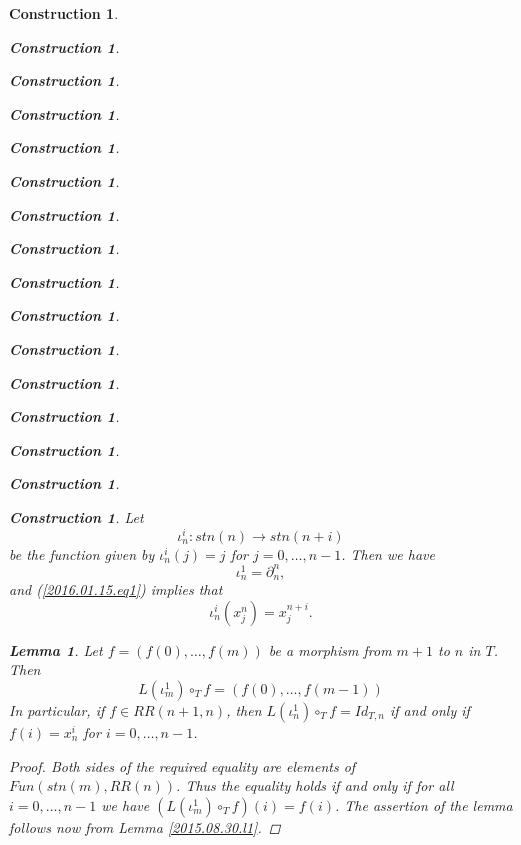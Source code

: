 \documentclass[onecolumn,12pt]{amsart}
\newtheorem{lemma}[proposition]{Lemma}
\numberwithin{proposition}{subsection}
\newtheorem{construction}[proposition]{Construction}
\newcommand{\sr}{\rightarrow}
\newcommand{\hc}{\circ_{T}}
\begin{document}
\begin{construction}
\begin{construction}
\begin{construction}
\begin{construction}
\begin{construction}
\begin{construction}
\begin{construction}
\begin{construction}
\begin{construction}
\begin{construction}
\begin{construction}
\begin{construction}
\begin{construction}
\begin{construction}
\begin{construction}
\begin{construction}
Let 
%
$${\iota}_n^{i}:stn(n)\sr stn(n+i)$$
%
be the function given by ${\iota}_n^i(j)=j$ for $j=0,\dots,n-1$. Then we have
%
\begin{equation}
\label{2015.08.22.eq7}
{\iota}_n^{1}=\partial_{n}^{n},
\end{equation}%
%
and (\ref{2016.01.15.eq1}) implies that 
%
\begin{equation}
\label{2015.08.22.eq8}
{\iota}_n^i(x^n_j)=x^{n+i}_j.
\end{equation}%
%
\begin{lemma}
\label{2015.08.26.l1}
Let $f=(f(0),\dots,f(m))$ be a morphism from $m+1$ to $n$ in $T$. Then
%
\begin{equation}\label{2016.01.15.eq3}
L(\iota_m^1)\hc f=(f(0),\dots,f(m-1))
\end{equation}%
%
In particular, if $f\in RR(n+1,n)$, then $L(\iota_n^1)\hc f=Id_{T,n}$ if and only if $f(i)=x_n^i$ for $i=0,\dots,n-1$. 
\end{lemma}
%
\begin{proof}
Both sides of the required equality are elements of
$Fun(stn(m),RR(n))$. Thus the equality holds if and only if for all
$i=0,\dots,n-1$ we have $(L(\iota_m^1)\hc f)(i)=f(i)$. The assertion of the
lemma follows now from Lemma \ref{2015.08.30.l1}.


\end{proof}
\end{construction}
\end{construction}
\end{construction}
\end{construction}
\end{construction}
\end{construction}
\end{construction}
\end{construction}
\end{construction}
\end{construction}
\end{construction}
\end{construction}
\end{construction}
\end{construction}
\end{construction}
\end{construction}
\end{document}

